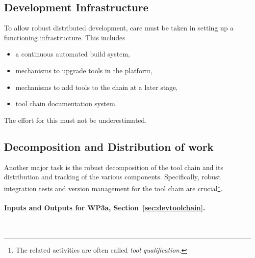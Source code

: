 \documentclass[11pt, a4paper]{article}
\begin{document}
\subsection{Development Infrastructure}

To allow robust distributed development, care must be taken in setting up a functioning infrastructure.  This includes 
\begin{itemize}
\item a continuous automated build system, 
\item mechanisms to upgrade tools in the platform, 
\item mechanisms to add tools to the chain at a later stage,
\item tool chain documentation system. 
\end{itemize}
 The effort for this must not be underestimated.

\subsection{Decomposition and Distribution of work}

Another major task is the robust decomposition of the tool chain and its 
distribution and tracking of the various components.  
Specifically, robust integration tests and version management for the tool chain are crucial\footnote{The related activities are often called {\it tool qualification}.}.



\paragraph{Inputs and Outputs for WP3a, Section~\ref{sec:devtoolchain}.}{~}\newline
\end{document}
